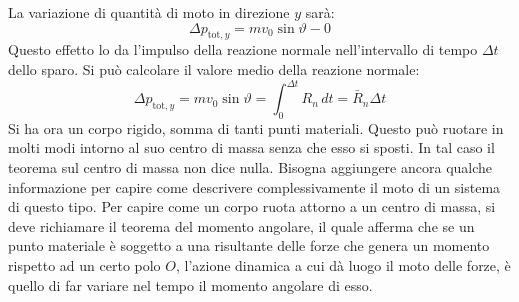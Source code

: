 \documentclass[10pt,a4paper]{book}
\begin{document}
La variazione di quantità di moto in direzione $y$ sarà:
\[
	\Delta p_{\text{tot},y}=mv_0\sin\vartheta-0
\]
Questo effetto lo da l'impulso della reazione normale nell'intervallo di tempo $\Delta t$ dello sparo. Si può calcolare il valore medio della reazione normale:
\[
	\Delta p_{\text{tot},y}=mv_0\sin\vartheta=\int_0^{\Delta t} R_n \,dt=\bar{R}_n\Delta t
\]
Si ha ora un corpo rigido, somma di tanti punti materiali. Questo può ruotare in molti modi intorno al suo centro di massa senza che esso si sposti. In tal caso il teorema sul centro di massa non dice nulla. Bisogna aggiungere ancora qualche informazione per capire come descrivere complessivamente il moto di un sistema di questo tipo.
Per capire come un corpo ruota attorno a un centro di massa, si deve richiamare il teorema del momento angolare, il quale afferma che se un punto materiale è soggetto a una risultante delle forze che genera un momento rispetto ad un certo polo $O$, l'azione dinamica a cui dà luogo il moto delle forze, è quello di far variare nel tempo il momento angolare di esso.
\end{document}
